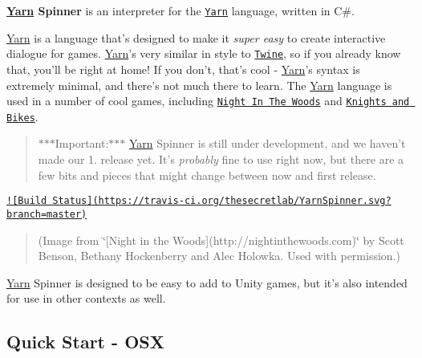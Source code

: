 

{\bfseries \hyperlink{a00031}{Yarn} Spinner} is an interpreter for the \href{https://github.com/infiniteammoinc/Yarn}{\tt Yarn} language, written in C\#.

\hyperlink{a00031}{Yarn} is a language that's designed to make it {\itshape super easy} to create interactive dialogue for games. \hyperlink{a00031}{Yarn}'s very similar in style to \href{http://twinery.org}{\tt Twine}, so if you already know that, you'll be right at home! If you don't, that's cool -\/ \hyperlink{a00031}{Yarn}'s syntax is extremely minimal, and there's not much there to learn. The \hyperlink{a00031}{Yarn} language is used in a number of cool games, including \href{http://nightinthewoods.com}{\tt Night In The Woods} and \href{https://www.kickstarter.com/projects/foamsword/knights-and-bikes}{\tt Knights and Bikes}.

\begin{quotation}
$\ast$$\ast$$\ast$\-Important\-:$\ast$$\ast$$\ast$ \hyperlink{a00031}{Yarn} Spinner is still under development, and we haven't made our 1. release yet. It's {\itshape probably} fine to use right now, but there are a few bits and pieces that might change between now and first release.

\end{quotation}


\href{https://travis-ci.org/thesecretlab/YarnSpinner}{\tt !\mbox{[}Build Status\mbox{]}(https\-://travis-\/ci.\-org/thesecretlab/\-Yarn\-Spinner.\-svg?branch=master)}



\begin{quotation}
(Image from \char`\"{}\mbox{[}\-Night in the Woods\mbox{]}(http\-://nightinthewoods.\-com)\char`\"{} by Scott Benson, Bethany Hockenberry and Alec Holowka. Used with permission.)

\end{quotation}


\hyperlink{a00031}{Yarn} Spinner is designed to be easy to add to Unity games, but it's also intended for use in other contexts as well.

\subsection*{Quick Start -\/ O\-S\-X}


